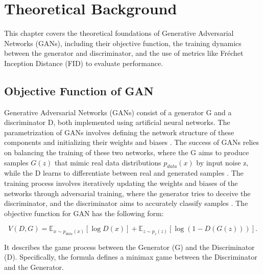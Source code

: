 \chapter{Theoretical Background}
\label{Theoretical Background for GAN}
This chapter covers the theoretical foundations of Generative Adversarial Networks (GANs),
including their objective function, the training dynamics between the generator and discriminator, 
and the use of metrics like Fréchet Inception Distance (FID) to evaluate performance. 



\section{Objective Function of GAN}

Generative Adversarial Networks (GANs) consist of a generator G and a discriminator D, 
both implemented using artificial neural networks. The parametrization of GANs involves 
defining the network structure of these components and initializing their weights and biases \citep{10.1007/s10928-021-09787-4}. 
The success of GANs relies on balancing the training of these two networks, where the 
G aims to produce samples $G(z)$ that mimic real data distributions $p_{data}(x)$ by input noise z, while the D 
learns to differentiate between real and generated samples \citep{10.1109/taslp.2017.2761547}. 
The training process involves iteratively updating the weights and biases of the networks through 
adversarial training, where the generator tries to deceive the discriminator, and the discriminator 
aims to accurately classify samples \citep{10.48550/arxiv.1802.05637}.
The objective function for GAN has the following form:


\begin{equation}
    \label{eq:min & max}
    V(D, G) = \mathbb{E}_{x \sim p_{data}(x)} [\log D(x)] + \mathbb{E}_{z \sim p_{z}(z)} [\log(1 - D(G(z)))].
\end{equation}



It describes the game process between the Generator (G) and the Discriminator (D). Specifically, 
the formula defines a minimax game between the Discriminator and the Generator.

